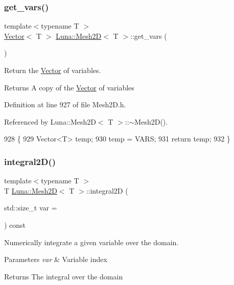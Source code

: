 \subsubsection{\texorpdfstring{get\+\_\+vars()}{get\_vars()}}
{\footnotesize\ttfamily template$<$typename T $>$ \\
\hyperlink{classLuna_1_1Vector}{Vector}$<$ T $>$ \hyperlink{classLuna_1_1Mesh2D}{Luna\+::\+Mesh2D}$<$ T $>$\+::get\+\_\+vars (\begin{DoxyParamCaption}{ }\end{DoxyParamCaption})}



Return the \hyperlink{classLuna_1_1Vector}{Vector} of variables. 

\begin{DoxyReturn}{Returns}
A copy of the \hyperlink{classLuna_1_1Vector}{Vector} of variables 
\end{DoxyReturn}


Definition at line 927 of file Mesh2\+D.\+h.



Referenced by Luna\+::\+Mesh2\+D$<$ T $>$\+::$\sim$\+Mesh2\+D().


\begin{DoxyCode}
928   \{
929     Vector<T> temp;
930     temp = VARS;
931     \textcolor{keywordflow}{return} temp;
932   \}
\end{DoxyCode}
\mbox{\label{classLuna_1_1Mesh2D_a32772d3c7093a5e3c1919e589ccdd810}} 
\subsubsection{\texorpdfstring{integral2\+D()}{integral2D()}}
{\footnotesize\ttfamily template$<$typename T $>$ \\
T \hyperlink{classLuna_1_1Mesh2D}{Luna\+::\+Mesh2D}$<$ T $>$\+::integral2D (\begin{DoxyParamCaption}\item[{std\+::size\+\_\+t}]{var = {} }\end{DoxyParamCaption}) const}



Numerically integrate a given variable over the domain. 


\begin{DoxyParams}{Parameters}
{\em var} & Variable index \\
\hline
\end{DoxyParams}
\begin{DoxyReturn}{Returns}
The integral over the domain 
\end{DoxyReturn}


